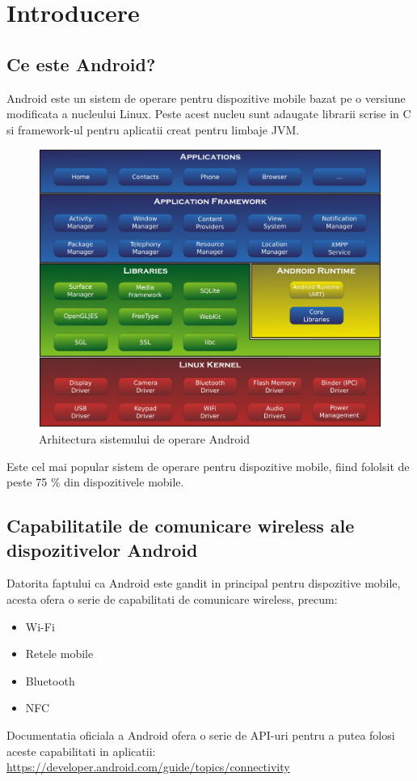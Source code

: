\section{Introducere}
\subsection{Ce este Android?}

Android este un sistem de operare pentru dispozitive mobile bazat pe o versiune modificata a nucleului Linux.
Peste acest nucleu sunt adaugate librarii scrise in C si framework-ul pentru aplicatii creat pentru limbaje JVM.

\begin{figure}[H]
    \centering
    \includegraphics[width=0.7\linewidth]{figs/android_stack.png}
    \caption{Arhitectura sistemului de operare Android}
    \label{fig:android_stack}
\end{figure}

Este cel mai popular sistem de operare pentru dispozitive mobile, fiind fololsit de peste 75 \% din dispozitivele mobile.

\subsection{Capabilitatile de comunicare wireless ale dispozitivelor Android}
Datorita faptului ca Android este gandit in principal pentru dispozitive mobile, acesta ofera o serie de capabilitati de comunicare wireless, precum:
\begin{itemize}
    \item Wi-Fi
    \item Retele mobile
    \item Bluetooth
    \item NFC
\end{itemize}
Documentatia oficiala a Android ofera o serie de API-uri pentru a putea folosi aceste capabilitati in aplicatii: \url{https://developer.android.com/guide/topics/connectivity}
